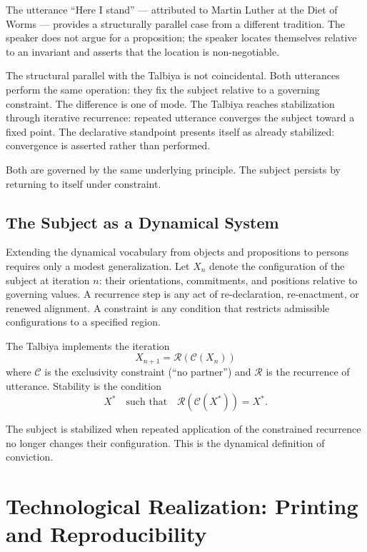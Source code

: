 \documentclass[12pt, oneside]{article}
\theoremstyle{definition}
\theoremstyle{remark}
\begin{document}
The utterance ``Here I stand'' --- attributed to Martin Luther at the Diet of Worms --- provides a structurally parallel case from a different tradition.
The speaker does not argue for a proposition; the speaker locates themselves relative to an invariant and asserts that the location is non-negotiable.

The structural parallel with the Talbiya is not coincidental.
Both utterances perform the same operation: they fix the subject relative to a governing constraint.
The difference is one of mode.
The Talbiya reaches stabilization through iterative recurrence: repeated utterance converges the subject toward a fixed point.
The declarative standpoint presents itself as already stabilized: convergence is asserted rather than performed.

Both are governed by the same underlying principle.
The subject persists by returning to itself under constraint.

\subsection{The Subject as a Dynamical System}

Extending the dynamical vocabulary from objects and propositions to persons requires only a modest generalization.
Let $X_{n}$ denote the configuration of the subject at iteration $n$: their orientations, commitments, and positions relative to governing values.
A recurrence step is any act of re-declaration, re-enactment, or renewed alignment.
A constraint is any condition that restricts admissible configurations to a specified region.

The Talbiya implements the iteration
\[
X_{n+1} = \mathcal{R}(\mathcal{C}(X_{n}))
\]
where $\mathcal{C}$ is the exclusivity constraint (``no partner'') and $\mathcal{R}$ is the recurrence of utterance.
Stability is the condition
\[
X^{*} \quad \text{such that} \quad \mathcal{R}(\mathcal{C}(X^{*})) = X^{*}.
\]

The subject is stabilized when repeated application of the constrained recurrence no longer changes their configuration.
This is the dynamical definition of conviction.

\section{Technological Realization: Printing and Reproducibility}
\end{document}

